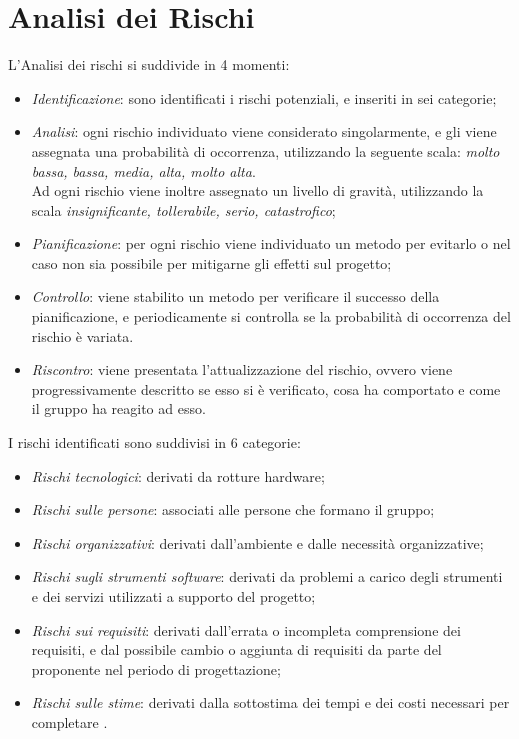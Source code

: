 \section{Analisi dei Rischi}
L'Analisi dei rischi si suddivide in 4 momenti:
\begin{itemize}
\item \textit{Identificazione}: sono identificati i rischi potenziali, e inseriti in sei categorie;
\item \textit{Analisi}: ogni rischio individuato viene considerato singolarmente, e gli viene assegnata una probabilità di occorrenza, utilizzando la seguente scala: \textit{molto bassa, bassa, media, alta, molto alta}. \\
Ad ogni rischio viene inoltre assegnato un livello di gravità, utilizzando la scala \textit{insignificante, tollerabile, serio, catastrofico};
\item \textit{Pianificazione}: per ogni rischio viene individuato un metodo per evitarlo o nel caso non sia possibile per mitigarne gli effetti sul progetto;
\item \textit{Controllo}: viene stabilito un metodo per verificare il successo della pianificazione, e periodicamente si controlla se la probabilità di occorrenza del rischio è variata.
\item \textit{Riscontro}: viene presentata l'attualizzazione del rischio, ovvero viene progressivamente descritto se esso si è verificato, cosa ha comportato e come il gruppo ha reagito ad esso.
\end{itemize}

I rischi identificati sono suddivisi in 6 categorie:
\begin{itemize}
\item \textit{Rischi tecnologici}: derivati da rotture hardware;
\item \textit{Rischi sulle persone}: associati alle persone che formano il gruppo;
\item \textit{Rischi organizzativi}: derivati dall'ambiente e dalle necessità organizzative;
\item \textit{Rischi sugli strumenti software}: derivati da problemi a carico degli strumenti e dei servizi utilizzati a supporto del progetto;
\item \textit{Rischi sui requisiti}: derivati dall'errata o incompleta comprensione dei requisiti, e dal possibile cambio o aggiunta di requisiti da parte del proponente nel periodo di progettazione;
\item \textit{Rischi sulle stime}: derivati dalla sottostima dei tempi e dei costi necessari per completare \ProjectName{}.
\end{itemize}

